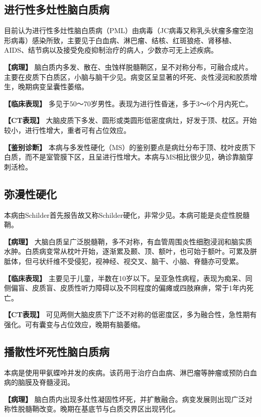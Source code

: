 \subsection{进行性多灶性脑白质病}

目前认为进行性多灶性脑白质病（PML）由病毒（JC病毒又称乳头状瘤多瘤空泡形病毒）感染所致，主要见于白血病、淋巴瘤、结核、红斑狼疮、肾移植、AIDS、结节病以及接受免疫抑制治疗的病人，少数亦可无上述疾病。

\textbf{【病理】}
脑白质内多发、散在、虫蚀样脱髓鞘区，呈不对称分布，可融合成片。主要在皮质下白质区，小脑与脑干少见。病变区呈显著的坏死、炎性浸润和胶质增生，晚期病变呈囊性萎缩。

\textbf{【临床表现】}
多见于50～70岁男性。表现为进行性昏迷，多于3～6个月内死亡。

\textbf{【CT表现】}
大脑皮质下多发、圆形或类圆形低密度病灶，好发于顶、枕区。开始较小，进行性增大，重者可有占位效应。

\textbf{【鉴别诊断】}
本病与多发性硬化（MS）的鉴别要点是病灶分布于顶、枕叶皮质下白质，而不是室管膜下区，且呈进行性增大。本病与MS相比很少见，确诊靠脑穿刺活检。

\subsection{弥漫性硬化}

本病由Schilder首先报告故又称Schilder硬化，非常少见。本病可能是炎症性脱髓鞘。

\textbf{【病理】}
大脑白质呈广泛脱髓鞘，多不对称，有血管周围炎性细胞浸润和脑实质水肿。白质病变常从枕叶开始，逐渐累及颞、顶、额叶，也可始于额叶。可累及胼胝体，但弓状纤维不受侵犯，视神经、视交叉、脑干、小脑、脊髓亦可受累。

\textbf{【临床表现】}
主要见于儿童，半数在10岁以下。呈亚急性病程，表现为痴呆、同侧偏盲、皮质盲、皮质性听力障碍以及不同程度的偏瘫或四肢麻痹，常于1年内死亡。

\textbf{【CT表现】}
可见两侧大脑皮质下广泛不对称的低密度区，多为融合性，急性期有强化。可有囊变与占位效应，晚期有脑萎缩。

\subsection{播散性坏死性脑白质病}

本病是使用甲氨蝶呤并发的疾病。该药用于治疗白血病、淋巴瘤等肿瘤或预防白血病的脑膜及脊髓浸润。

\textbf{【病理】}
脑白质内出现多灶性凝固性坏死，并扩散融合。病变发展则出现广泛对称性脱髓鞘改变。晚期在基底节与白质交界区出现钙化。

